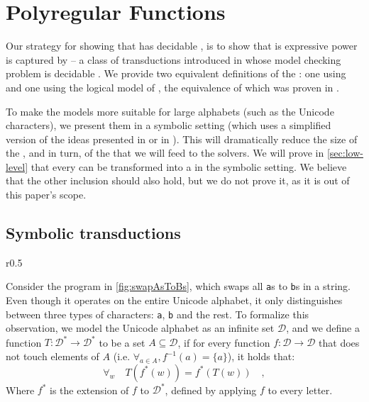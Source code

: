 \newpage
\section{Polyregular Functions}
\label{sec:polyregular}

Our strategy for showing that  has decidable ,
is to show that is expressive power is captured by  -- 
a class of transductions introduced in \cite{bojanczyk2018polyregular} whose model checking 
problem is decidable \cite[Theorem~1.7]{bojanczyk2018polyregular}. 
We provide two equivalent definitions of the : one using  \cite[p.
19]{bojanczyk2018polyregular} and one using the logical model of
 \cite[Definition
4]{bojanczyk2019string}, the equivalence of which 
was proven in
\cite{bojanczyk2018polyregular}.

To make the models more suitable for large alphabets (such as the Unicode
characters), we present them in a symbolic setting (which uses a simplified
version of the ideas presented in \cite{d2017power} or in
\cite[Section~3.1]{bojanczyk2023growth}). This will dramatically reduce the
size of the , and in turn, of
the  that we will feed to the solvers. We will prove in
\cref{sec:low-level} that every  can be
transformed into a  in the
symbolic setting. We believe that the other inclusion should also hold,
but we do not prove it, as it is out of this paper's scope.

\subsection{Symbolic transductions}

\begin{wrapfigure}{r}{0.5\textwidth}
    
    \caption{The \texttt{swapAsToBs} program.}
    \label{fig:swapAsToBs}
\end{wrapfigure}

\AP
Consider the program in \cref{fig:swapAsToBs}, which swaps all \texttt{a}s to
\texttt{b}s in a string. Even though it operates on the entire Unicode
alphabet, it only distinguishes between three types of characters: \texttt{a},
\texttt{b} and the rest.
To formalize this observation, we model the Unicode alphabet as an infinite set $\mathcal{D}$, and
we define a function $T : \mathcal{D}^* \to \mathcal{D}^*$ to be
 a set $A \subseteq \mathcal{D}$, if for every function $f:
\mathcal{D} \to \mathcal{D}$ that does not touch elements of $A$ (i.e.
$\forall_{a\in A}, f^{-1}(a) = \{a\}$), it holds that:
\begin{equation*}
    \forall_{w} \quad T(f^*(w)) = f^*(T(w)) \quad ,
\end{equation*}
Where $f^*$ is the extension of $f$ to $\mathcal{D}^*$, defined by applying $f$
to every letter.

